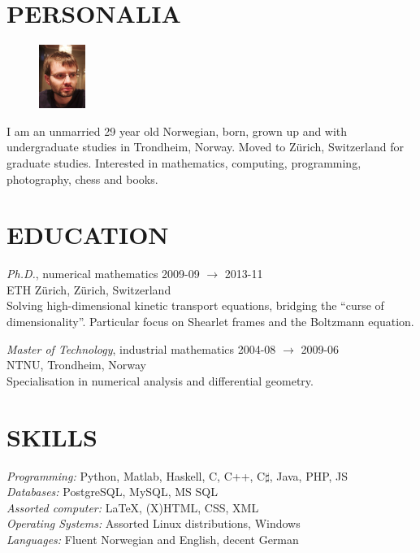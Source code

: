 \documentclass[line,margin]{res}
\newcommand{\zh}{Z\"{u}rich}
\begin{document}
\address{Forchstrasse 168, CH-8032 \zh}
\address{+41 78 634 68 37, evfonn@gmail.com}


\begin{resume}

\section{PERSONALIA}
    \begin{figure}
        \vspace{-0.6cm}
        \includegraphics[width=1.5cm]{photo.png}
    \end{figure}
    I am an unmarried 29 year old Norwegian, born, grown up and with undergraduate studies in Trondheim,
    Norway. Moved to Z\"urich, Switzerland for graduate studies. Interested in mathematics, computing,
    programming, photography, chess and books. 


\section{EDUCATION} 
    {\em Ph.D.}, numerical mathematics \hfill 2009-09 $\to$ 2013-11 \\
    ETH \zh, \zh, Switzerland \\
    Solving high-dimensional kinetic transport equations, bridging the ``curse
    of dimensionality''. Particular focus on Shearlet frames and the Boltzmann
    equation.

    {\em Master of Technology}, industrial mathematics \hfill 2004-08 $\to$ 2009-06 \\
    NTNU, Trondheim, Norway \\
    Specialisation in numerical analysis and differential geometry.


\section{SKILLS}
    {\em Programming:} Python, Matlab, Haskell, C, C++, C$\sharp$, Java, PHP, JS \\
    {\em Databases:} PostgreSQL, MySQL, MS SQL \\
    {\em Assorted computer:} \LaTeX, (X)HTML, CSS, XML \\
    {\em Operating Systems:} Assorted Linux distributions, Windows \\
    {\em Languages:} Fluent Norwegian and English, decent German



\end{resume}
\end{document}
